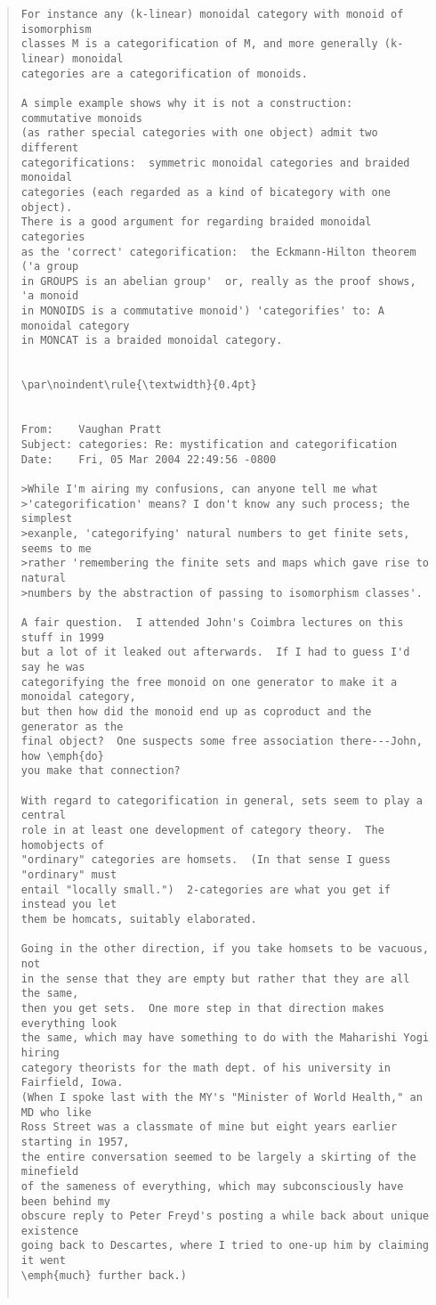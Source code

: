 \begin{quote}
\begin{verbatim}
For instance any (k-linear) monoidal category with monoid of isomorphism
classes M is a categorification of M, and more generally (k-linear) monoidal
categories are a categorification of monoids.

A simple example shows why it is not a construction:  commutative monoids
(as rather special categories with one object) admit two different
categorifications:  symmetric monoidal categories and braided monoidal
categories (each regarded as a kind of bicategory with one object).
There is a good argument for regarding braided monoidal categories
as the 'correct' categorification:  the Eckmann-Hilton theorem ('a group
in GROUPS is an abelian group'  or, really as the proof shows, 'a monoid
in MONOIDS is a commutative monoid') 'categorifies' to: A monoidal category
in MONCAT is a braided monoidal category.


\par\noindent\rule{\textwidth}{0.4pt}


From: 	 Vaughan Pratt 
Subject: categories: Re: mystification and categorification
Date: 	 Fri, 05 Mar 2004 22:49:56 -0800	

>While I'm airing my confusions, can anyone tell me what
>'categorification' means? I don't know any such process; the simplest
>exanple, 'categorifying' natural numbers to get finite sets, seems to me
>rather 'remembering the finite sets and maps which gave rise to natural
>numbers by the abstraction of passing to isomorphism classes'.

A fair question.  I attended John's Coimbra lectures on this stuff in 1999
but a lot of it leaked out afterwards.  If I had to guess I'd say he was
categorifying the free monoid on one generator to make it a monoidal category,
but then how did the monoid end up as coproduct and the generator as the
final object?  One suspects some free association there---John, how \emph{do}
you make that connection?

With regard to categorification in general, sets seem to play a central
role in at least one development of category theory.  The homobjects of
"ordinary" categories are homsets.  (In that sense I guess "ordinary" must
entail "locally small.")  2-categories are what you get if instead you let
them be homcats, suitably elaborated.

Going in the other direction, if you take homsets to be vacuous, not
in the sense that they are empty but rather that they are all the same,
then you get sets.  One more step in that direction makes everything look
the same, which may have something to do with the Maharishi Yogi hiring
category theorists for the math dept. of his university in Fairfield, Iowa.
(When I spoke last with the MY's "Minister of World Health," an MD who like
Ross Street was a classmate of mine but eight years earlier starting in 1957,
the entire conversation seemed to be largely a skirting of the minefield
of the sameness of everything, which may subconsciously have been behind my
obscure reply to Peter Freyd's posting a while back about unique existence
going back to Descartes, where I tried to one-up him by claiming it went
\emph{much} further back.)


\end{verbatim}
\end{quote}
